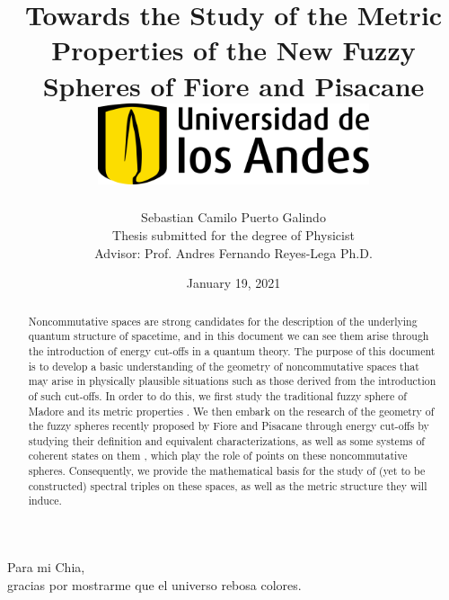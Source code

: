 \documentclass[12pt]{report}
\title 
{
	{Towards the Study of the Metric Properties of the New Fuzzy Spheres of Fiore and Pisacane}\\
	\vspace{1.5cm}
	{\includegraphics[width = 0.6\textwidth]{logo.png}}	
}
\author{Sebastian Camilo Puerto Galindo\\[1cm]{\small Thesis submitted for the degree of Physicist}\\ {\small  Advisor: Prof. Andres Fernando Reyes-Lega Ph.D.}}
\date{January 19, 2021}
\newenvironment{dedication}
  {\clearpage           %
   \thispagestyle{empty}%
   \vspace*{\stretch{1}}%
   \raggedleft          %
  }
  {\par %
   \vspace{\stretch{3}} %
   \clearpage           %
  }
\theoremstyle{definition}
\begin{document}

\maketitle

\begin{dedication}
{\LARGE\calligra Para mi Chia,\\ gracias por mostrarme que el universo rebosa colores.}
\end{dedication}

\begin{abstract}
Noncommutative spaces are strong candidates for the description of the underlying quantum structure of spacetime, and in this document we can see them arise through the introduction of energy cut-offs in a quantum theory. The purpose of this document is to develop a basic understanding of the geometry of noncommutative spaces that may arise in physically plausible situations such as those derived from the introduction of such cut-offs. In order to do this, we first study the traditional fuzzy sphere of Madore \cite{Madore} and its metric properties \cite{DAndrea2013}. We then embark on the research of the geometry of the fuzzy spheres recently proposed by Fiore and Pisacane \cite{Fiore2018} through energy cut-offs by studying their definition and equivalent characterizations, as well as some systems of coherent states on them \cite{FioreCoherent2020, FioreXi2020}, which play the role of points on these noncommutative spheres. Consequently, we provide the mathematical basis for the  study of (yet to be constructed) spectral triples on these spaces, as well as the metric structure they will induce. %
\end{abstract}
\end{document}
